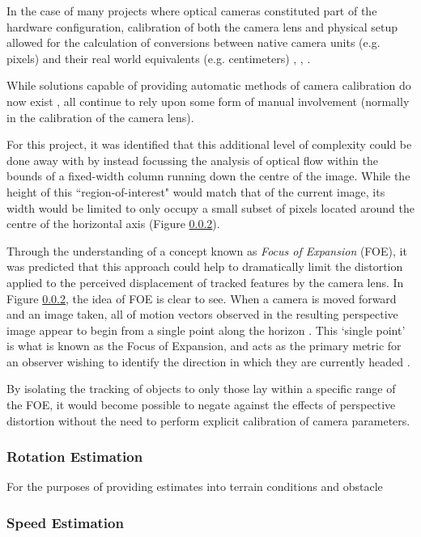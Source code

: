 In the case of many projects where optical cameras constituted part of the hardware configuration, calibration of both the camera lens and physical setup allowed for the calculation of conversions between native camera units (e.g. pixels) and their real world equivalents (e.g. centimeters) \cite{campbell}, \cite{low}, \cite{}.

While solutions capable of providing automatic methods of camera calibration do now exist \cite{camera-calib}, all continue to rely upon some form of manual involvement (normally in the calibration of the camera lens). 

For this project, it was identified that this additional level of complexity could be done away with by instead focussing the analysis of optical flow within the bounds of a fixed-width column running down the centre of the image. While the height of this ``region-of-interest" would match that of the current image, its width would be limited to only occupy a small subset of pixels located around the centre of the horizontal axis (Figure \ref{}). 

Through the understanding of a concept known as \textit{Focus of Expansion} (FOE), it was  predicted that this approach could help to dramatically limit the distortion applied to the perceived displacement of tracked features by the camera lens. In Figure \ref{}, the idea of FOE is clear to see. When a camera is moved forward and an image taken, all of motion vectors observed in the resulting perspective image appear to begin from a single point along the horizon \cite{stanford-cs}. This `single point' is what is known as the Focus of Expansion, and acts as the primary metric for an observer wishing to identify the direction in which they are currently headed \cite{texas-cs}. 

By isolating the tracking of objects to only those lay within a specific range of the FOE, it would become possible to negate against the effects of perspective distortion without the need to perform explicit calibration of camera parameters. 

\subsubsection{Rotation Estimation}

For the purposes of providing estimates into terrain conditions and obstacle  

\subsubsection{Speed Estimation}


